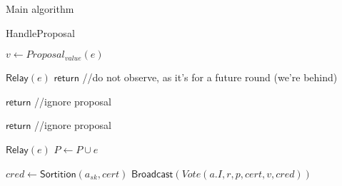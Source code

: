 \documentclass[10pt,a4paper]{article}
\begin{document}
\begin{section}{Main algorithm}
\begin{subsection}{HandleProposal}\label{ssect:HandleProposal}

    \begin{algorithm}[H]
        \begin{algorithmic}[1]

            \State $v \gets Proposal_{value}(e)$

                \State $\mathsf{Relay}(e)$
                \State $\mathsf{return}$  //do not observe, as it's for a future round (we're behind)
            \EndIf

                \State $\mathsf{return}$  //ignore proposal
            \EndIf

                \State $\mathsf{return}$ //ignore proposal
            \EndIf

            \State $\mathsf{Relay}(e)$
            \State $P \gets P \cup e$

                    \State $cred \gets 
                    \mathsf{Sortition}(a_{sk}, cert)$
                        \State $\mathsf{Broadcast}(Vote(a.I, r, p, cert, v,  cred))$
                    \EndIf
                \EndFor    
            \EndIf

        \EndFunction
        \end{algorithmic}
        \caption{\underline{HandleProposal}}
    \end{algorithm}
    

\end{subsection}
\end{section}
\end{document}
